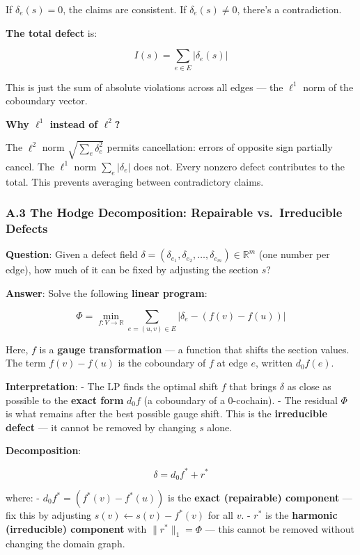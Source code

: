 \documentclass[
]{article}
\begin{document}
If \(\delta_e(s) = 0\), the claims are consistent. If
\(\delta_e(s) \neq 0\), there's a contradiction.

\textbf{The total defect} is:

\[I(s) = \sum_{e \in E} |\delta_e(s)|\]

This is just the sum of absolute violations across all edges --- the
\(\ell^1\) norm of the coboundary vector.

\textbf{Why \(\ell^1\) instead of \(\ell^2\)?}

The \(\ell^2\) norm \(\sqrt{\sum_e \delta_e^2}\) permits cancellation:
errors of opposite sign partially cancel. The \(\ell^1\) norm
\(\sum_e |\delta_e|\) does not. Every nonzero defect contributes to the
total. This prevents averaging between contradictory claims.

\subsubsection{A.3 The Hodge Decomposition: Repairable vs.~Irreducible
Defects}\label{a.3-the-hodge-decomposition-repairable-vs.-irreducible-defects}

\textbf{Question}: Given a defect field
\(\delta = (\delta_{e_1}, \delta_{e_2}, \ldots, \delta_{e_m}) \in \mathbb{R}^m\)
(one number per edge), how much of it can be fixed by adjusting the
section \(s\)?

\textbf{Answer}: Solve the following \textbf{linear program}:

\[\Phi = \min_{f: V \to \mathbb{R}} \sum_{e = (u,v) \in E} |\delta_e - (f(v) - f(u))|\]

Here, \(f\) is a \textbf{gauge transformation} --- a function that
shifts the section values. The term \(f(v) - f(u)\) is the coboundary of
\(f\) at edge \(e\), written \(d_0 f(e)\).

\textbf{Interpretation}: - The LP finds the optimal shift \(f\) that
brings \(\delta\) as close as possible to the \textbf{exact form}
\(d_0 f\) (a coboundary of a 0-cochain). - The residual \(\Phi\) is what
remains after the best possible gauge shift. This is the
\textbf{irreducible defect} --- it cannot be removed by changing \(s\)
alone.

\textbf{Decomposition}:

\[\delta = d_0 f^* + r^*\]

where: - \(d_0 f^* = (f^*(v) - f^*(u))\) is the \textbf{exact
(repairable) component} --- fix this by adjusting
\(s(v) \gets s(v) - f^*(v)\) for all \(v\). - \(r^*\) is the
\textbf{harmonic (irreducible) component} with \(\|r^*\|_1 = \Phi\) ---
this cannot be removed without changing the domain graph.
\end{document}
